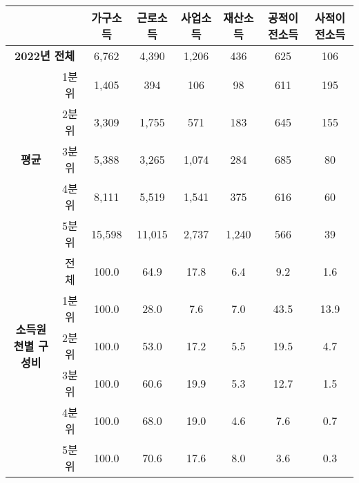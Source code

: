 \begin{tabular}{c|c|c|c|c|c|c|c}
\toprule
\multicolumn{2}{c|}{} & \textbf{가구소득} & \textbf{근로소득} & \textbf{사업소득} & \textbf{재산소득} & \textbf{공적이전소득} & \textbf{사적이전소득} \\ \midrule 
\multicolumn{2}{c|}{\textbf{2022년 전체}} & 6,762 & 4,390 & 1,206 & 436 & 625 & 106 \\ \hline
\multirow{5}{*}{\textbf{평균}} & 1분위 & 1,405 & 394 & 106 & 98 & 611 & 195 \\
 & 2분위 & 3,309 & 1,755 & 571 & 183 & 645 & 155 \\ 
 & 3분위 & 5,388 & 3,265 & 1,074 & 284 & 685 & 80 \\
 & 4분위 & 8,111 & 5,519 & 1,541 & 375 & 616 & 60 \\
 & 5분위 & 15,598 & 11,015 & 2,737 & 1,240 & 566 & 39 \\ \hline
\multirow{5}{*}{\textbf{소득원천별 구성비}} & 전체 & 100.0 & 64.9 & 17.8 & 6.4 & 9.2 & 1.6 \\ \cline{2-8}
 & 1분위 & 100.0 & \cellcolor{myblue}28.0 & 7.6 & 7.0 & \cellcolor{myblue}43.5 & \cellcolor{myblue}13.9 \\
 & 2분위 & 100.0 & 53.0 & 17.2 & 5.5 & 19.5 & 4.7 \\
 & 3분위 & 100.0 & 60.6 & 19.9 & 5.3 & 12.7 & 1.5 \\
 & 4분위 & 100.0 & 68.0 & 19.0 & 4.6 & 7.6 & 0.7 \\ 
 & 5분위 & 100.0 & 70.6 & 17.6 & 8.0 & 3.6 & 0.3 \\ \bottomrule
\end{tabular}